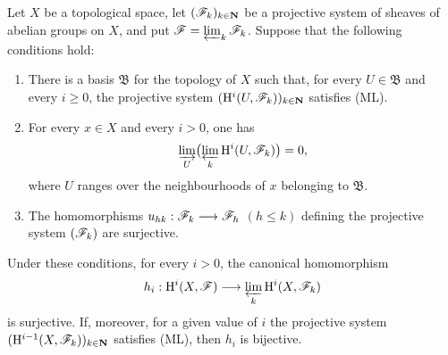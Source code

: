 \begin{proposition}[13.3.1]
\label{0.13.3.1}
Let $X$ be a topological space, let
$(\mathscr{F}_k)_{k\in\mathbf{N}}$ be a projective system of sheaves of
abelian groups on $X$, and put
$\mathscr{F}=\varprojlim_k\mathscr{F}_k$.
Suppose that the following conditions hold:
\begin{enumerate}
  \item[{\rm(i)}]
  There is a basis $\mathfrak{B}$ for the topology of $X$ such that,
  for every $U\in\mathfrak{B}$ and every $i\geq0$, the projective
  system
  $(\mathrm{H}^i(U,\mathscr{F}_k))_{k\in\mathbf{N}}$ satisfies (ML).

  \item[{\rm(ii)}]
  For every $x\in X$ and every $i>0$, one has
  \[
    \varinjlim_U\bigl(\varprojlim_k
    \mathrm{H}^i(U,\mathscr{F}_k)\bigr)=0,
  \]
  where $U$ ranges over the neighbourhoods of $x$ belonging to
  $\mathfrak{B}$.

  \item[{\rm(iii)}]
  The homomorphisms
  $u_{hk}:\mathscr{F}_k\longrightarrow\mathscr{F}_h$ $(h\leq k)$ defining the
  projective system $(\mathscr{F}_k)$ are surjective.
\end{enumerate}
Under these conditions, for every $i>0$, the canonical homomorphism
\[
  h_i:\mathrm{H}^i(X,\mathscr{F})
  \longrightarrow
  \varprojlim_k\mathrm{H}^i(X,\mathscr{F}_k)
\]
is surjective. If, moreover, for a given value of $i$ the projective
system
$(\mathrm{H}^{i-1}(X,\mathscr{F}_k))_{k\in\mathbf{N}}$ satisfies (ML), then $h_i$ is
bijective.
\end{proposition}

